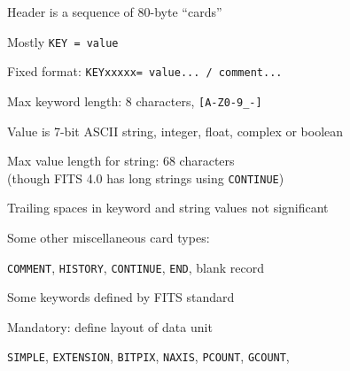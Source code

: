 \documentclass[20pt,landscape]{foils}
\begin{document}
\begin{list0}
\vspace*{-0.15cm}
  \item Header is a sequence of 80-byte ``cards''
\vspace*{-0.15cm}
  \begin{list2big}
    \item Mostly {\color{brown}\tt KEY = value}
    \begin{list3}
      \item Fixed format:
            {\color{brown}\verb*|KEYxxxxx= value... / comment...|}
      \item Max keyword length: 8 characters,
            {\color{brown}\verb|[A-Z0-9_-]|}
      \item Value is 7-bit ASCII string, integer, float, complex or boolean
      \item Max value length for string: 68 characters \\
            (though FITS 4.0 has long strings using {\color{brown}\tt CONTINUE})
      \item Trailing spaces in keyword and string values not significant
\vspace*{-0.15cm}
    \end{list3}
\vspace*{-0.15cm}
    \item Some other miscellaneous card types:
\vspace*{-0.15cm}
    \begin{list3}
      \item {\color{brown}\tt COMMENT},
            {\color{brown}\tt HISTORY},
            {\color{brown}\tt CONTINUE},
            {\color{brown}\tt END},
            blank record
\vspace*{-0.15cm}
    \end{list3}
\vspace*{-0.15cm}
    \item Some keywords defined by FITS standard
\vspace*{-0.1cm}
    \begin{list3}
      \item Mandatory: define layout of data unit
      \begin{list4}
        \item[] {\color{brown}\tt SIMPLE},
                {\color{brown}\tt EXTENSION},
                {\color{brown}\tt BITPIX},
                {\color{brown}\tt NAXIS},
                {\color{brown}\tt PCOUNT},
                {\color{brown}\tt GCOUNT},

\end{list4}
\end{list3}
\end{list2big}
\end{list0}
\end{document}
